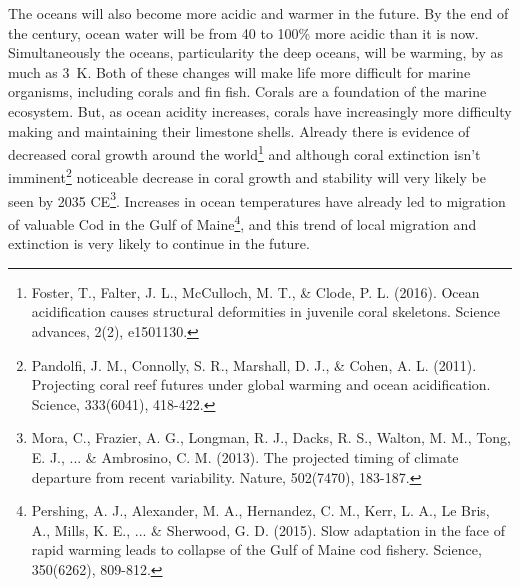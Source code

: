 The oceans will also become more acidic and warmer in the future. By the end of the century, ocean water will be from 40 to 100\% more acidic than it is now. Simultaneously the oceans, particularity the deep oceans, will be warming, by as much as \SI {3}{\kelvin}. Both of these changes will make life more difficult for marine organisms, including corals and fin fish. Corals are a foundation of the marine ecosystem. But, as ocean acidity increases, corals have increasingly more difficulty making and maintaining their limestone shells. Already there is evidence of decreased coral growth around the world\footnote{Foster, T., Falter, J. L., McCulloch, M. T., \& Clode, P. L. (2016). Ocean acidification causes structural deformities in juvenile coral skeletons. Science advances, 2(2), e1501130.} and although coral extinction isn't imminent\footnote{Pandolfi, J. M., Connolly, S. R., Marshall, D. J., \& Cohen, A. L. (2011). Projecting coral reef futures under global warming and ocean acidification. Science, 333(6041), 418-422.}  noticeable decrease in coral growth and stability will very likely be seen by 2035 CE\footnote{Mora, C., Frazier, A. G., Longman, R. J., Dacks, R. S., Walton, M. M., Tong, E. J., ... \& Ambrosino, C. M. (2013). The projected timing of climate departure from recent variability. Nature, 502(7470), 183-187.}. Increases in ocean temperatures have already led to migration of valuable Cod in the Gulf of Maine\footnote{Pershing, A. J., Alexander, M. A., Hernandez, C. M., Kerr, L. A., Le Bris, A., Mills, K. E., ... \& Sherwood, G. D. (2015). Slow adaptation in the face of rapid warming leads to collapse of the Gulf of Maine cod fishery. Science, 350(6262), 809-812.}, and this trend of local migration and extinction is very likely to continue in the future. 

